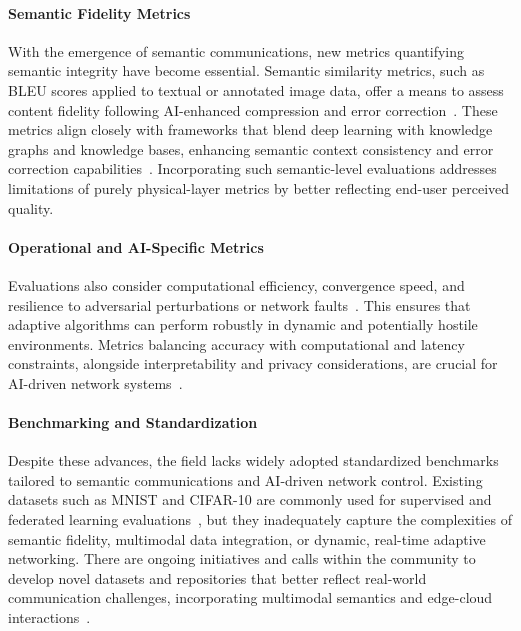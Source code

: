 \documentclass[sigconf]{acmart}
\begin{document}
\paragraph{Semantic Fidelity Metrics} With the emergence of semantic communications, new metrics quantifying semantic integrity have become essential. Semantic similarity metrics, such as BLEU scores applied to textual or annotated image data, offer a means to assess content fidelity following AI-enhanced compression and error correction~\cite{ref1,ref3,ref50}. These metrics align closely with frameworks that blend deep learning with knowledge graphs and knowledge bases, enhancing semantic context consistency and error correction capabilities~\cite{ref1}. Incorporating such semantic-level evaluations addresses limitations of purely physical-layer metrics by better reflecting end-user perceived quality.

\paragraph{Operational and AI-Specific Metrics} Evaluations also consider computational efficiency, convergence speed, and resilience to adversarial perturbations or network faults~\cite{ref5,ref7,ref10}. This ensures that adaptive algorithms can perform robustly in dynamic and potentially hostile environments. Metrics balancing accuracy with computational and latency constraints, alongside interpretability and privacy considerations, are crucial for AI-driven network systems~\cite{ref7,ref50}.

\paragraph{Benchmarking and Standardization} Despite these advances, the field lacks widely adopted standardized benchmarks tailored to semantic communications and AI-driven network control. Existing datasets such as MNIST and CIFAR-10 are commonly used for supervised and federated learning evaluations~\cite{ref5}, but they inadequately capture the complexities of semantic fidelity, multimodal data integration, or dynamic, real-time adaptive networking. There are ongoing initiatives and calls within the community to develop novel datasets and repositories that better reflect real-world communication challenges, incorporating multimodal semantics and edge-cloud interactions~\cite{ref50}. 
\end{document}
